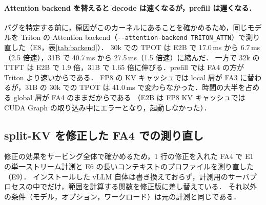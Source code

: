 \paragraph{Attention backend を替えると decode は速くなるが，prefill は遅くなる．}
バグを特定する前に，原因がこのカーネルにあることを確かめるため，同じモデルを Triton の Attention backend（\texttt{-{}-attention-backend TRITON\_ATTN}）で測り直した（E8，表\ref{tab:backend}）．
30k での TPOT は E2B で 17.0\,ms から 6.7\,ms（2.5 倍速），31B で 40.7\,ms から 27.5\,ms（1.5 倍速）に縮んだ．
一方で 32k の TTFT は E2B で 1.9 倍，31B で 1.65 倍に伸びる．prefill では FA4 の方が Triton より速いからである．
FP8 の KV キャッシュでは local 層が FA3 に替わるが，31B の 30k での TPOT は 41.0\,ms で変わらなかった．時間の大半を占める global 層が FA4 のままだからである
（E2B は FP8 KV キャッシュでは CUDA Graph の取り込み中にエラーとなり，起動しなかった）．

\subsection{split-KV を修正した FA4 での測り直し}
\label{sec:ctx-fix}
修正の効果をサービング全体で確かめるため，1 行の修正を入れた FA4 で E1 の単一ストリーム計測と E6 の長いコンテキストのプロファイルを測り直した（E9）．
インストールした vLLM 自体は書き換えておらず，計測用のサーバプロセスの中でだけ，範囲を計算する関数を修正版に差し替えている．
それ以外の条件（モデル，オプション，ワークロード）は元の計測と同じである．

